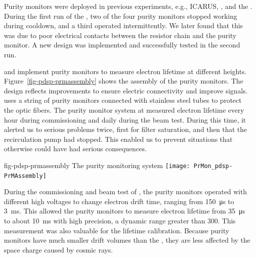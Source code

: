 Purity monitors were deployed in previous  experiments, e.g., ICARUS, \microboone, and the . During the first run of the , two of the four purity monitors stopped working during cooldown, and a third operated intermittently. We later found that this was due to poor electrical contacts between the resistor chain and the purity monitor. A new design was implemented and successfully tested in the second run. 


 and  %
implement purity monitors to %
measure electron lifetime at different heights.  Figure~\ref{fig-pdsp-prmassembly} shows the assembly of the  purity monitors. The design reflects improvements to ensure electric connectivity and improve signals.  uses a string of purity monitors connected with stainless steel tubes to protect the optic fibers. The purity monitor system at  measured electron lifetime every hour during commissioning and daily during the beam test. During %
this time, it %
alerted us to serious problems twice, first %
for filter saturation, and %
then that the recirculation pump had stopped. This enabled us to prevent %
situations that otherwise could have had serious consequences.

\begin{dunefigure}{fig-pdsp-prmassembly}
  {The  purity monitoring system}
  \texttt{[image: PrMon\_pdsp-PrMAssembly]}
\end{dunefigure}



During the commissioning and beam test of , the purity monitors operated with different high voltages to change electron drift time, ranging from \SI{150}{\micro\second} to \SI{3}{\milli\second}. This allowed the  purity monitors to measure electron lifetime from \SI{35}{\micro\second} to about \SI{10}{\milli\second} with high precision, a dynamic range greater than \num{300}. %
This measurement was also valuable for the  lifetime calibration. Because purity monitors have much smaller drift volumes than the , they are less affected by the space charge caused by cosmic rays. 

